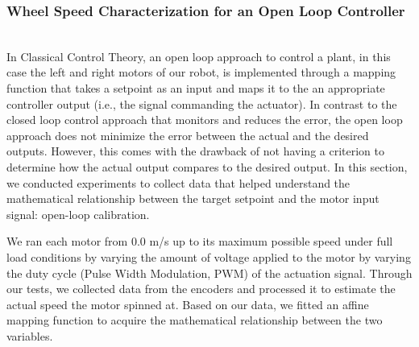 \documentclass[journal]{IEEEtran}
\begin{document}
\subsubsection{Wheel Speed Characterization for an Open Loop Controller} \hfill \\

In Classical Control Theory, an open loop approach to control a plant, in this case the left and right motors of our robot, is implemented through a mapping function that takes a setpoint as an input and maps it to the an appropriate controller output (i.e., the signal commanding the actuator). In contrast to the closed loop control approach that monitors and reduces the error, the open loop approach does not minimize the error between the actual and the desired outputs. However, this comes with the drawback of not having a criterion to determine how the actual output compares to the desired output. In this section, we conducted experiments to collect data that helped understand the mathematical relationship between the target setpoint and the motor input signal: open-loop calibration.

We ran each motor from 0.0 m/s up to its maximum possible speed under full load conditions by varying the amount of voltage applied to the motor by varying the duty cycle (Pulse Width Modulation, PWM) of the actuation signal. Through our tests, we collected data from the encoders and processed it to estimate the actual speed the motor spinned at. Based on our data, we fitted an affine mapping function to acquire the mathematical relationship between the two variables.
\end{document}
